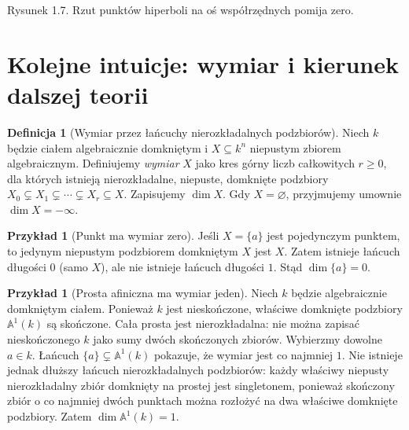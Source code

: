 \documentclass[11pt,a4paper,openany]{report}
\numberwithin{equation}{section}
\theoremstyle{plain}
\theoremstyle{definition}
\newtheorem{definicja}[twierdzenie]{Definicja}
\newtheorem{przyklad}[twierdzenie]{Przykład}
\theoremstyle{remark}
\newcommand{\A}{\mathbb A}
\begin{document}
\begin{center}
\end{center}
\begin{center}\small Rysunek 1.7. Rzut punktów hiperboli na oś współrzędnych pomija zero.\end{center}

\section{Kolejne intuicje: wymiar i kierunek dalszej teorii}

\begin{definicja}[Wymiar przez łańcuchy nierozkładalnych podzbiorów]
Niech $k$ będzie ciałem algebraicznie domkniętym i
$X\subseteq k^n$ niepustym zbiorem algebraicznym.
Definiujemy \emph{wymiar} $X$ jako kres górny liczb
całkowitych $r\ge0$, dla których istnieją
nierozkładalne, niepuste, domknięte podzbiory
$X_0\subsetneq X_1\subsetneq\cdots\subsetneq X_r\subseteq X$.
Zapisujemy $\dim X$. Gdy $X=\varnothing$, przyjmujemy
umownie $\dim X=-\infty$.
\end{definicja}

\begin{przyklad}[Punkt ma wymiar zero]
Jeśli $X=\{a\}$ jest pojedynczym punktem, to jedynym
niepustym podzbiorem domkniętym $X$ jest $X$.
Zatem istnieje łańcuch długości $0$ (samo $X$),
ale nie istnieje łańcuch długości $1$.
Stąd $\dim\{a\}=0$.
\end{przyklad}

\begin{przyklad}[Prosta afiniczna ma wymiar jeden]
Niech $k$ będzie algebraicznie domkniętym ciałem.
Ponieważ $k$ jest nieskończone, właściwe domknięte
podzbiory $\A^1(k)$ są skończone.
Cała prosta jest nierozkładalna: nie można zapisać
nieskończonego $k$ jako sumy dwóch skończonych zbiorów.
Wybierzmy dowolne $a\in k$. Łańcuch
$\{a\}\subsetneq\A^1(k)$ pokazuje, że wymiar jest co najmniej $1$.
Nie istnieje jednak dłuższy łańcuch nierozkładalnych
podzbiorów: każdy właściwy niepusty nierozkładalny zbiór
domknięty na prostej jest singletonem, ponieważ skończony
zbiór o co najmniej dwóch punktach można rozłożyć na dwa
właściwe domknięte podzbiory.
Zatem $\dim\A^1(k)=1$.
\end{przyklad}
\end{document}

